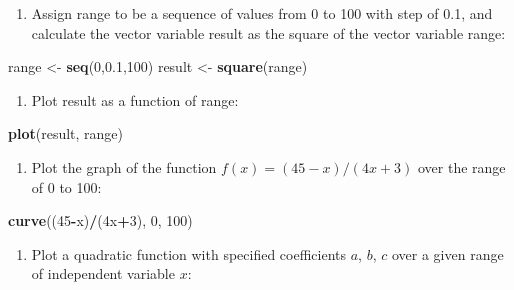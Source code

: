 \documentclass[
]{book}
\newenvironment{Shaded}{\begin{snugshade}}{\end{snugshade}}
\newcommand{\DecValTok}[1]{\textcolor[rgb]{0.00,0.00,0.81}{#1}}
\newcommand{\FloatTok}[1]{\textcolor[rgb]{0.00,0.00,0.81}{#1}}
\newcommand{\KeywordTok}[1]{\textcolor[rgb]{0.13,0.29,0.53}{\textbf{#1}}}
\newcommand{\NormalTok}[1]{#1}
\newcommand{\OperatorTok}[1]{\textcolor[rgb]{0.81,0.36,0.00}{\textbf{#1}}}
\newcommand{\StringTok}[1]{\textcolor[rgb]{0.31,0.60,0.02}{#1}}
\providecommand{\tightlist}{%
  \setlength{\itemsep}{0pt}\setlength{\parskip}{0pt}}
\theoremstyle{definition}
\theoremstyle{definition}
\theoremstyle{definition}
\theoremstyle{remark}
\begin{document}
\begin{enumerate}
\def\labelenumi{\arabic{enumi}.}
\setcounter{enumi}{1}
\tightlist
\item
  Assign range to be a sequence of values from 0 to 100 with step of 0.1, and calculate the vector variable result as the square of the vector variable range:
\end{enumerate}

\begin{Shaded}
\begin{Highlighting}[]
\NormalTok{range \textless{}{-}}\StringTok{ }\KeywordTok{seq}\NormalTok{(}\DecValTok{0}\NormalTok{,}\FloatTok{0.1}\NormalTok{,}\DecValTok{100}\NormalTok{)}
\NormalTok{result \textless{}{-}}\StringTok{ }\KeywordTok{square}\NormalTok{(range)}
\end{Highlighting}
\end{Shaded}

\begin{enumerate}
\def\labelenumi{\arabic{enumi}.}
\setcounter{enumi}{2}
\tightlist
\item
  Plot result as a function of range:
\end{enumerate}

\begin{Shaded}
\begin{Highlighting}[]
\KeywordTok{plot}\NormalTok{(result, range)}
\end{Highlighting}
\end{Shaded}

\begin{enumerate}
\def\labelenumi{\arabic{enumi}.}
\setcounter{enumi}{3}
\tightlist
\item
  Plot the graph of the function \(f(x) = (45-x)/(4x+3)\) over the range of 0 to 100:
\end{enumerate}

\begin{Shaded}
\begin{Highlighting}[]
\KeywordTok{curve}\NormalTok{((}\DecValTok{45}\OperatorTok{{-}}\NormalTok{x)}\OperatorTok{/}\NormalTok{(4x}\OperatorTok{+}\DecValTok{3}\NormalTok{), }\DecValTok{0}\NormalTok{, }\DecValTok{100}\NormalTok{)}
\end{Highlighting}
\end{Shaded}

\begin{enumerate}
\def\labelenumi{\arabic{enumi}.}
\setcounter{enumi}{4}
\tightlist
\item
  Plot a quadratic function with specified coefficients \(a\), \(b\), \(c\) over a given range of independent variable \(x\):
\end{enumerate}
\end{document}
